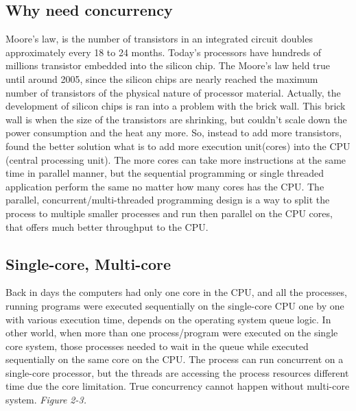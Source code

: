 \documentclass[12pt]{article}
\begin{document}
\subsection{Why need concurrency}
Moore’s law, is the number of transistors in an integrated circuit doubles approximately every 18 to 24 months. Today’s processors have hundreds of millions transistor embedded into the silicon chip. The Moore’s law held true until around 2005, since the silicon chips are nearly reached the maximum number of transistors of the physical nature of processor material. Actually, the development of silicon chips is ran into a problem with the brick wall. This brick wall is when the size of the transistors are shrinking, but couldn’t scale down the power consumption and the heat any more. So, instead to add more transistors, found the better solution what is to add more execution unit(cores) into the CPU (central processing unit). The more cores can take more instructions at the same time in parallel manner, but the sequential programming or single threaded application perform the same no matter how many cores has the CPU. The parallel, concurrent/multi-threaded programming design is a way to split the process to multiple smaller processes and run then parallel on the CPU cores, that offers much better throughput to the CPU.\cite{Vasudevan}


\subsection{Single-core, Multi-core}
Back in days the computers had only one core in the CPU, and all the processes, running programs were executed sequentially on the single-core CPU one by one with various execution time, depends on the operating system queue logic. In other world, when more than one process/program were executed on the single core system, those processes needed to wait in the queue while executed sequentially on the same core on the CPU. The process can run concurrent on a single-core processor, but the threads are accessing the process resources different time due the core limitation. True concurrency cannot happen without multi-core system. \textit{\color{gray}Figure 2-3.}\\ 
\end{document}
